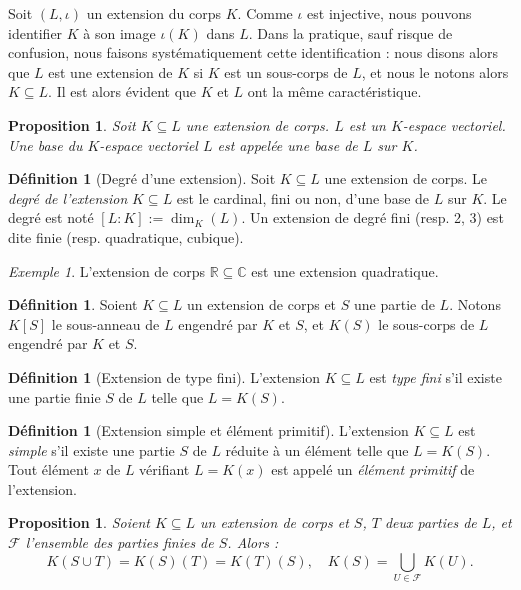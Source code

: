 \documentclass[a4paper, titlepage]{article}
\newtheorem{prop}[theo]{Proposition}
\theoremstyle{definition}
\newtheorem{defi}[theo]{Définition}
\theoremstyle{remark}
\newtheorem{exem}[theo]{Exemple}
\def\R{\mathbb R}
\def\C{\mathbb C}
\begin{document}
Soit $(L, \iota)$ un extension du corps $K$. Comme $\iota$ est injective, nous pouvons identifier $K$ à son image $\iota(K)$ dans $L$. Dans la pratique, sauf risque de confusion, nous faisons systématiquement cette identification : nous disons alors que $L$ est une extension de $K$ si $K$ est un sous-corps de $L$, et nous le notons alors $K\subseteq L$. Il est alors évident que $K$ et $L$ ont la même caractéristique.

\begin{prop}
Soit $K \subseteq L$ une extension de corps. $L$ est un $K$-espace vectoriel. Une base du $K$-espace vectoriel $L$ est appelée une base de $L$ sur $K$.
\end{prop}

\begin{defi}[Degré d'une extension]
Soit $K \subseteq L$ une extension de corps. Le \textit{degré de l'extension} $K \subseteq L$ est le cardinal, fini ou non, d'une base de $L$ sur $K$. Le degré est noté $[L:K] := \dim_K(L)$. Un extension de degré fini (resp. 2, 3) est dite finie (resp. quadratique, cubique).
\end{defi}

\begin{exem}
L'extension de corps $\R \subseteq \C$ est une extension quadratique.
\end{exem}

\begin{defi}
Soient $K\subseteq L$ un extension de corps et $S$ une partie de $L$. Notons $K[S]$ le sous-anneau de $L$ engendré par $K$ et $S$, et $K(S)$ le sous-corps de $L$ engendré par $K$ et $S$.
\end{defi}

\begin{defi}[Extension de type fini]
L'extension $K \subseteq L$ est \textit{type fini} s'il existe une partie finie $S$ de $L$ telle que $L=K(S)$.
\end{defi}

\begin{defi}[Extension simple et élément primitif]
L'extension $K \subseteq L$ est \textit{simple} s'il existe une partie $S$ de $L$ réduite à un élément telle que $L=K(S)$.
Tout élément $x$ de $L$ vérifiant $L=K(x)$ est appelé un \textit{élément primitif} de l'extension.
\end{defi}

\begin{prop}
Soient $K \subseteq L$ un extension de corps et $S$, $T$ deux parties de $L$, et $\mathcal F$ l'ensemble des parties finies de $S$. Alors :
$$K( S \cup T) = K(S)(T) = K(T)(S), \quad K(S) = \bigcup_{U\in\mathcal F} K(U).$$
\end{prop}
\end{document}
